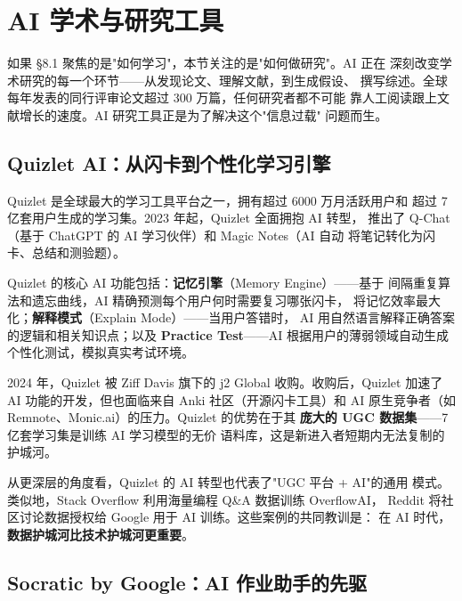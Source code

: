 
\section{AI 学术与研究工具}
\label{sec:life-academic}

如果 §8.1 聚焦的是"如何学习"，本节关注的是"如何做研究"。AI 正在
深刻改变学术研究的每一个环节——从发现论文、理解文献，到生成假设、
撰写综述。全球每年发表的同行评审论文超过 300 万篇，任何研究者都不可能
靠人工阅读跟上文献增长的速度。AI 研究工具正是为了解决这个"信息过载"
问题而生。

\subsection{Quizlet AI：从闪卡到个性化学习引擎}
\label{subsec:quizlet}

Quizlet 是全球最大的学习工具平台之一，拥有超过 6000 万月活跃用户和
超过 7 亿套用户生成的学习集。2023 年起，Quizlet 全面拥抱 AI 转型，
推出了 Q-Chat（基于 ChatGPT 的 AI 学习伙伴）和 Magic Notes（AI 自动
将笔记转化为闪卡、总结和测验题）。

Quizlet 的核心 AI 功能包括：\textbf{记忆引擎}（Memory Engine）——基于
间隔重复算法和遗忘曲线，AI 精确预测每个用户何时需要复习哪张闪卡，
将记忆效率最大化；\textbf{解释模式}（Explain Mode）——当用户答错时，
AI 用自然语言解释正确答案的逻辑和相关知识点；以及 \textbf{Practice
Test}——AI 根据用户的薄弱领域自动生成个性化测试，模拟真实考试环境。

2024 年，Quizlet 被 Ziff Davis 旗下的 j2 Global 收购。收购后，Quizlet
加速了 AI 功能的开发，但也面临来自 Anki 社区（开源闪卡工具）和
AI 原生竞争者（如 Remnote、Monic.ai）的压力。Quizlet 的优势在于其
\textbf{庞大的 UGC 数据集}——7 亿套学习集是训练 AI 学习模型的无价
语料库，这是新进入者短期内无法复制的护城河。

从更深层的角度看，Quizlet 的 AI 转型也代表了"UGC 平台 + AI"的通用
模式。类似地，Stack Overflow 利用海量编程 Q\&A 数据训练 OverflowAI，
Reddit 将社区讨论数据授权给 Google 用于 AI 训练。这些案例的共同教训是：
在 AI 时代，\textbf{数据护城河比技术护城河更重要}。


\subsection{Socratic by Google：AI 作业助手的先驱}
\label{subsec:socratic}

